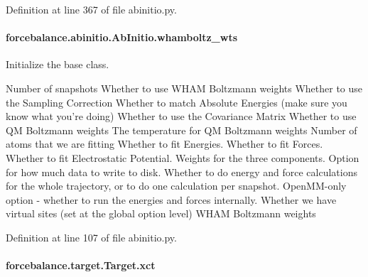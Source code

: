 Definition at line 367 of file abinitio.\-py.

\hypertarget{classforcebalance_1_1abinitio_1_1AbInitio_a885e7ef58b9e7c6abbc24321e5f3c61a}{
\paragraph[{whamboltz\-\_\-wts}]{\setlength{\rightskip}{0pt plus 5cm}forcebalance.\-abinitio.\-Ab\-Initio.\-whamboltz\-\_\-wts\hspace{0.3cm}{\ttfamily [inherited]}}}\label{classforcebalance_1_1abinitio_1_1AbInitio_a885e7ef58b9e7c6abbc24321e5f3c61a}


Initialize the base class. 

Number of snapshots Whether to use W\-H\-A\-M Boltzmann weights Whether to use the Sampling Correction Whether to match Absolute Energies (make sure you know what you're doing) Whether to use the Covariance Matrix Whether to use Q\-M Boltzmann weights The temperature for Q\-M Boltzmann weights Number of atoms that we are fitting Whether to fit Energies. Whether to fit Forces. Whether to fit Electrostatic Potential. Weights for the three components. Option for how much data to write to disk. Whether to do energy and force calculations for the whole trajectory, or to do one calculation per snapshot. Open\-M\-M-\/only option -\/ whether to run the energies and forces internally. Whether we have virtual sites (set at the global option level) W\-H\-A\-M Boltzmann weights 

Definition at line 107 of file abinitio.\-py.

\hypertarget{classforcebalance_1_1target_1_1Target_aad2e385cfbf7b4a68f1c2cb41133fe82}{
\paragraph[{xct}]{\setlength{\rightskip}{0pt plus 5cm}forcebalance.\-target.\-Target.\-xct\hspace{0.3cm}{\ttfamily [inherited]}}}\label{classforcebalance_1_1target_1_1Target_aad2e385cfbf7b4a68f1c2cb41133fe82}


